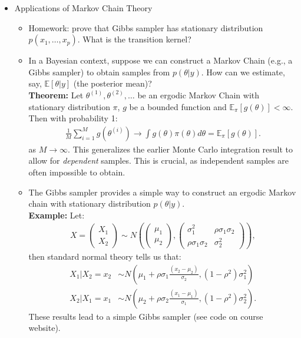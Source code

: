 \documentclass[11pt]{article}
\begin{document}
\begin{itemize}
\item Applications of Markov Chain Theory
\begin{itemize}
    \item Homework: prove that Gibbs sampler has stationary distribution $p(x_{1},\ldots,x_{p})$. What is the transition kernel?
    \item In a Bayesian context, suppose we can construct a Markov Chain (e.g., a Gibbs sampler) to obtain samples from $p(\theta|y)$. How can we estimate, say, $\mathbb{E}\left[\theta|y\right]$ (the posterior mean)?\\$ $\\
    \textbf{Theorem:}  Let $\theta^{(1)},\theta^{(2)},\ldots$ be an ergodic Markov Chain with stationary distribution $\pi$, $g$ be a bounded function and $\mathbb{E}_{\pi}\left[g(\theta)\right]<\infty$. Then with probability 1:
    \begin{align*}
    \frac{1}{M}\sum_{i=1}^{M}g(\theta^{(i)}) \rightarrow \int g(\theta)\pi(\theta)d\theta = \mathbb{E}_{\pi}\left[g(\theta)\right] .
    \end{align*}
    as $M\rightarrow\infty$. This generalizes the earlier Monte Carlo integration result to allow for \emph{dependent} samples. This is crucial, as independent samples are often impossible to obtain.
    \item The Gibbs sampler provides a simple way to construct an ergodic Markov chain with stationary distribution $p(\theta|y)$. \\
    $ $\\
    \textbf{Example:} Let:
    \begin{align*}
     X = \left(\begin{array}{c} X_{1} \\ X_{2} \end{array}\right) \sim N\left(\left(\begin{array}{c} \mu_{1} \\ \mu_{2} \end{array}\right) , \left(\begin{array}{cc} \sigma^{2}_{1} & \rho\sigma_{1}\sigma_{2} \\ \rho\sigma_{1}\sigma_{2} & \sigma_{2}^{2} \end{array}\right) \right) ,
    \end{align*}
    then standard normal theory tells us that:
    \begin{align*}
    X_{1} | X_{2}=x_{2} &\sim N\left( \mu_{1} + \rho\sigma_{1}\frac{(x_{2}-\mu_{2})}{\sigma_{2}} , (1-\rho^{2})\sigma_{1}^{2} \right) \\
    X_{2} | X_{1}=x_{1} &\sim N\left( \mu_{2} + \rho\sigma_{2}\frac{(x_{1}-\mu_{1})}{\sigma_{1}} , (1-\rho^{2})\sigma_{2}^{2} \right) .
    \end{align*}
    These results lead to a simple Gibbs sampler (see code on course website). 
    

\end{itemize}
\end{itemize}
\end{document}
